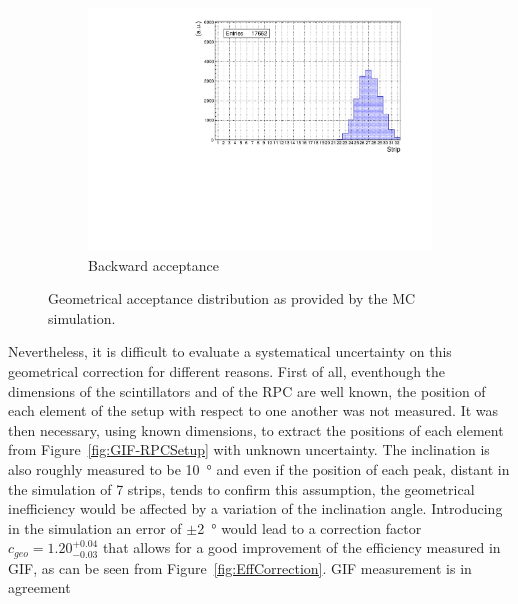 \begin{figure}[H]
\begin{subfigure}{0.5\linewidth}
			\includegraphics[width = 0.6\plotwidth]{fig/chapt5/Geometrical-acceptance-backward.pdf}
			\caption{\label{fig:SimResult:C} Backward acceptance}
		\end{subfigure}
		\caption{\label{fig:SimResult} Geometrical acceptance distribution as provided by the \acl{MC} simulation.}
	\end{figure}
	
	Nevertheless, it is difficult to evaluate a systematical uncertainty on this geometrical correction for different reasons. First of all, eventhough the dimensions of the scintillators and of the RPC are well known, the position of each element of the setup with respect to one another was not measured. It was then necessary, using known dimensions, to extract the positions of each element from Figure~\ref{fig:GIF-RPCSetup} with unknown uncertainty. The inclination is also roughly measured to be \SI{10}{\degree} and even if the position of each peak, distant in the simulation of 7 strips, tends to confirm this assumption, the geometrical inefficiency would be affected by a variation of the inclination angle. Introducing in the simulation an error of $\pm$\SI{2}{\degree} would lead to a correction factor $c_{geo} = 1.20^{+0.04}_{-0.03}$ that allows for a good improvement of the efficiency measured in GIF, as can be seen from Figure~\ref{fig:EffCorrection}. GIF measurement is in agreement 

